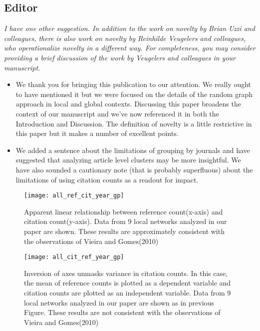 \documentclass[11pt, oneside]{article}   	%
\begin{document}
\begin{itemize}
\begin{enumerate}
\subsection{Editor}
\emph{I have one other suggestion. In addition to the work on novelty by Brian Uzzi and colleagues, there is also work on novelty by Reinhilde Veugelers and colleagues, who operationalize novelty in a different way. For completeness, you may consider providing a brief discussion of the work by Veugelers and colleagues in your manuscript.}
\begin{itemize}
\item We thank you for bringing this publication to our attention. We really ought to have mentioned it but we were focused on the details of the random graph approach in local and global contexts. Discussing this paper broadens the context of our manuscript and we've now referenced it in both the Introduction and Discussion. The definition of novelty is a little restrictive in this paper but it makes a number of excellent points.
\item We added a sentence about the limitations of grouping by journals and have suggested that analyzing article level clusters may be more insightful. We have also sounded a cautionary note (that is probably superfluous) about the limitations of using citation counts as a readout for impact. \end{itemize}
 
 \newpage

\begin{figure}[tbhp]
\centering
\texttt{[image: all\_ref\_cit\_year\_gp]}     
\caption{Apparent linear relationship between reference count(x-axis) and citation count(y-axis). Data from 9 local networks analyzed in our paper are shown. These results are approximately consistent with the observations of Vieira and Gomes(2010)} 
\label{fig:refcit}
\end{figure}
\newpage

\begin{figure}[tbhp]
\centering
\texttt{[image: all\_cit\_ref\_year\_gp]}     
\caption{Inversion of axes unmasks variance in citation counts. In this case, the mean of reference counts is plotted as a dependent variable and citation counts are plotted as an independent variable. Data from 9 local networks analyzed in our paper are shown as in previous Figure. These results are not consistent with the observations  of Vieira and Gomes(2010)} 
\label{fig:citref}
\end{figure}
\newpage


\end{enumerate}
\end{itemize}
\end{document}

